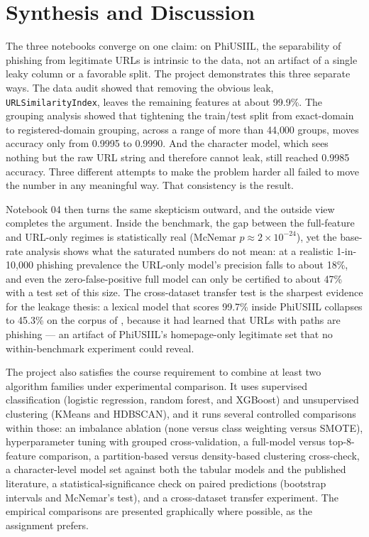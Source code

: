 \documentclass[stu,12pt,floatsintext]{apa7}
\newcommand{\code}[1]{\texttt{#1}}
\begin{document}
\section{Synthesis and Discussion}

The three notebooks converge on one claim: on PhiUSIIL, the separability
of phishing from legitimate URLs is intrinsic to the data, not an artifact
of a single leaky column or a favorable split. The project demonstrates
this three separate ways. The data audit showed that removing the obvious
leak, \code{URLSimilarityIndex}, leaves the remaining features at about
99.9\%. The grouping analysis showed that tightening the train/test split
from exact-domain to registered-domain grouping, across a range of more
than 44{,}000 groups, moves accuracy only from 0.9995 to 0.9990. And the
character model, which sees nothing but the raw URL string and therefore
cannot leak, still reached 0.9985 accuracy. Three different attempts to
make the problem harder all failed to move the number in any meaningful
way. That consistency is the result.

Notebook 04 then turns the same skepticism outward, and the outside view
completes the argument. Inside the benchmark, the gap between the
full-feature and URL-only regimes is statistically real (McNemar
$p \approx 2 \times 10^{-24}$), yet the base-rate analysis shows what the
saturated numbers do not mean: at a realistic 1-in-10{,}000 phishing
prevalence the URL-only model's precision falls to about 18\%, and even
the zero-false-positive full model can only be certified to about 47\%
with a test set of this size. The cross-dataset transfer test is the
sharpest evidence for the leakage thesis: a lexical model that scores
99.7\% inside PhiUSIIL collapses to 45.3\% on the corpus of
\textcite{sahingoz2019}, because it had learned that URLs with paths are
phishing --- an artifact of PhiUSIIL's homepage-only legitimate set that
no within-benchmark experiment could reveal.

The project also satisfies the course requirement to combine at least two
algorithm families under experimental comparison. It uses supervised
classification (logistic regression, random forest, and XGBoost) and
unsupervised clustering (KMeans and HDBSCAN), and it runs several
controlled comparisons within those: an imbalance ablation
(none versus class weighting versus SMOTE), hyperparameter tuning with
grouped cross-validation, a full-model versus top-8-feature comparison, a
partition-based versus density-based clustering cross-check, a
character-level model set against both the tabular models and the
published literature, a statistical-significance check on paired
predictions (bootstrap intervals and McNemar's test), and a cross-dataset
transfer experiment. The empirical comparisons are presented graphically
where possible, as the assignment prefers.
\end{document}
